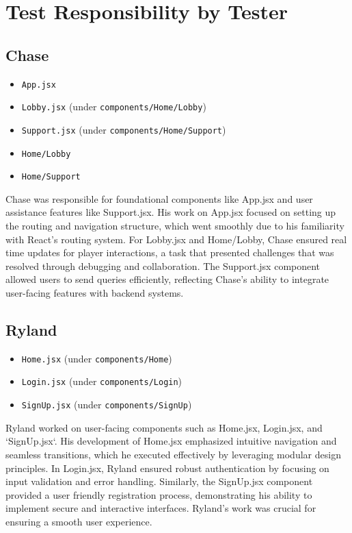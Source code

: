 \section*{Test Responsibility by Tester}

\subsection*{Chase}
\begin{itemize}
    \item \texttt{App.jsx}
    \item \texttt{Lobby.jsx} (under \texttt{components/Home/Lobby})
    \item \texttt{Support.jsx} (under \texttt{components/Home/Support})
    \item \texttt{Home/Lobby}
    \item \texttt{Home/Support}
\end{itemize}

\noindent Chase was responsible for foundational components like App.jsx and user assistance features like Support.jsx. His work on App.jsx focused on setting up the routing and navigation structure, which went smoothly due to his familiarity with React's routing system. For Lobby.jsx and Home/Lobby, Chase ensured real time updates for player interactions, a task that presented challenges that was resolved through debugging and collaboration. The Support.jsx component allowed users to send queries efficiently, reflecting Chase's ability to integrate user-facing features with backend systems.

\subsection*{Ryland}
\begin{itemize}
    \item \texttt{Home.jsx} (under \texttt{components/Home})
    \item \texttt{Login.jsx} (under \texttt{components/Login})
    \item \texttt{SignUp.jsx} (under \texttt{components/SignUp})
\end{itemize}

\noindent Ryland worked on user-facing components such as Home.jsx, Login.jsx, and `SignUp.jsx`. His development of Home.jsx emphasized intuitive navigation and seamless transitions, which he executed effectively by leveraging modular design principles. In Login.jsx, Ryland ensured robust authentication by focusing on input validation and error handling. Similarly, the SignUp.jsx component provided a user friendly registration process, demonstrating his ability to implement secure and interactive interfaces. Ryland’s work was crucial for ensuring a smooth user experience.

